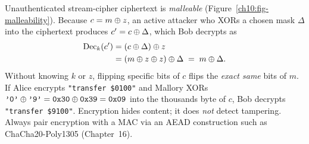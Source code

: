 \begin{trapbox}
Unauthenticated stream-cipher ciphertext is \emph{malleable} (Figure~\ref{ch10:fig-malleability}). Because $c = m \oplus z$, an active attacker who XORs a chosen mask $\Delta$ into the ciphertext produces $c' = c \oplus \Delta$, which Bob decrypts as
\begin{align*}
  \operatorname{Dec}_k(c')
  &= (c \oplus \Delta) \oplus z \\
  &= (m \oplus z \oplus z) \oplus \Delta \;=\; m \oplus \Delta.
\end{align*}
Without knowing $k$ or $z$, flipping specific bits of $c$ flips the \emph{exact same} bits of $m$. If Alice encrypts \texttt{"transfer \$0100"} and Mallory XORs $\texttt{'0'} \oplus \texttt{'9'} = \texttt{0x30} \oplus \texttt{0x39} = \texttt{0x09}$ into the thousands byte of $c$, Bob decrypts \texttt{"transfer \$9100"}. Encryption hides content; it does \emph{not} detect tampering. Always pair encryption with a MAC via an AEAD construction such as ChaCha20-Poly1305 (Chapter~16).
\end{trapbox}

